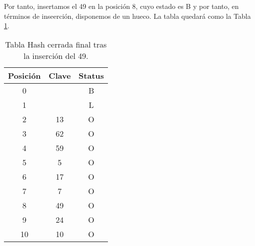 \begin{ejercicio}
\begin{enumerate}
        Por tanto, insertamos el 49 en la posición 8, cuyo estado es B y por tanto, en términos de inseerción, disponemos de un hueco. La tabla quedará como la Tabla \ref{fig:HashTras49}.
        \begin{table}
            \centering
            \begin{tabular}{c|c|c}
            Posición & Clave & Status \\ \hline \hline
            0        &          & B      \\
            1        &          & L      \\
            2        & 13       & O      \\
            3        & 62       & O      \\
            4        & 59       & O      \\
            5        & 5        & O      \\
            6        & 17       & O      \\
            7        & 7        & O      \\
            8        & 49       & O      \\
            9        & 24       & O      \\
            10       & 10       & O     
            \end{tabular}
            \caption{Tabla Hash cerrada final tras la inserción del 49.}
            \label{fig:HashTras49}
        \end{table}
        
        
    \end{enumerate}
\end{ejercicio}